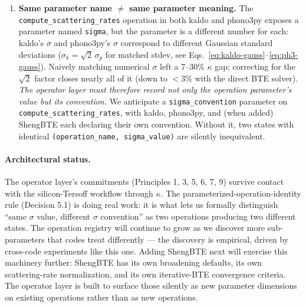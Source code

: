 \documentclass[11pt,a4paper]{article}
\begin{document}
\begin{enumerate}[leftmargin=2em]
        (and the LO--TO splitting, permutation symmetrization, and Born--Huang invariance
        operations that will follow) all share the pattern $\tau \to \tau$: same input and
        output type, distinguished only by an additional provenance entry on the output. By
        Decision 5 (identity = type + provenance), input and output are formally distinct
        states despite sharing a type. This pattern lets us factor cross-code disagreements that
        live in correction \emph{variants} and \emph{timing}, not in the operation's structural
        type signature.
  \item \textbf{Same parameter name $\neq$ same parameter meaning.} The
        \texttt{compute\_scattering\_rates} operation in both kaldo and phono3py exposes a
        parameter named \texttt{sigma}, but the parameter is a different number for each: kaldo's
        $\sigma$ and phono3py's $\sigma$ correspond to different Gaussian standard deviations
        ($\sigma_k = \sqrt{2}\,\sigma_p$ for matched stdev, see
        Eqs.~\eqref{eq:kaldo-gauss}--\eqref{eq:ph3-gauss}). Naively matching numerical
        $\sigma$ left a 7--30\% $\kappa$ gap; correcting for the $\sqrt{2}$ factor closes
        nearly all of it (down to $<$3\% with the direct BTE solver). \emph{The operator layer
        must therefore record not only the operation parameter's value but its convention.}
        We anticipate a \texttt{sigma\_convention} parameter on
        \texttt{compute\_scattering\_rates}, with kaldo, phono3py, and (when added) ShengBTE
        each declaring their own convention. Without it, two states with identical
        \texttt{(operation\_name, sigma\_value)} are silently inequivalent.
\end{enumerate}

\paragraph{Architectural status.} The operator layer's commitments (Principles 1, 3, 5, 6, 7, 9)
survive contact with the silicon-Tersoff workflow through $\kappa$. The
parameterized-operation-identity rule (Decision 5.1) is doing real work: it is what lets us
formally distinguish ``same $\sigma$ value, different $\sigma$ convention'' as two
operations producing two different states. The operation registry will continue to grow as
we discover more sub-parameters that codes treat differently --- the discovery is empirical,
driven by cross-code experiments like this one. Adding ShengBTE next will exercise this
machinery further: ShengBTE has its own broadening defaults, its own scattering-rate
normalization, and its own iterative-BTE convergence criteria. The operator layer is built to
surface those silently as new parameter dimensions on existing operations rather than as
new operations.
\end{document}
